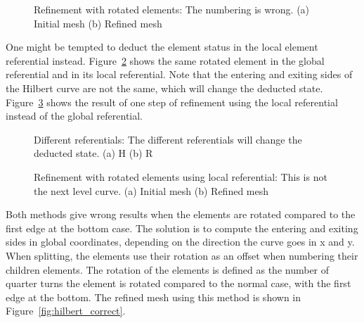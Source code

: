 \begin{figure}[H]
	\centering
	\hfill
	\caption{Refinement with rotated elements: The numbering is wrong. (a) Initial mesh (b) Refined mesh}\label{fig:hilbert_rotated}
\end{figure}

One might be tempted to deduct the element status in the local element referential instead.
Figure~\ref{fig:referentials} shows the same rotated element in the global referential and in its
local referential. Note that the entering and exiting sides of the Hilbert curve are not the same,
which will change the deducted state. Figure~\ref{fig:hilbert_local} shows the result of one step of
refinement using the local referential instead of the global referential.

\begin{figure}[H]
	\centering
	\hfill
	\caption{Different referentials: The different referentials will change the deducted state. (a) H (b) R}\label{fig:referentials}
\end{figure}

\begin{figure}[H]
	\centering
	\hfill
	\caption{Refinement with rotated elements using local referential: This is not the next level curve. (a) Initial mesh (b) Refined mesh}\label{fig:hilbert_local}
\end{figure}

Both methods give wrong results when the elements are rotated compared to the first edge at the
bottom case. The solution is to compute the entering and exiting sides in global coordinates,
depending on the direction the curve goes in x and y. When splitting, the elements use their
rotation as an offset when numbering their children elements. The rotation of the elements is
defined as the number of quarter turns the element is rotated compared to the normal case, with the
first edge at the bottom. The refined mesh using this method is shown in
Figure~\ref{fig:hilbert_correct}.

